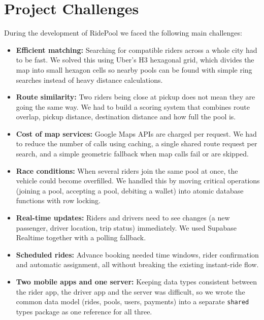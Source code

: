 \section{Project Challenges}
\label{sec:challenges}

During the development of RidePool we faced the following main challenges:

\begin{itemize}
  \item \textbf{Efficient matching:} Searching for compatible riders across a
        whole city had to be fast. We solved this using Uber's H3 hexagonal
        grid, which divides the map into small hexagon cells so nearby pools
        can be found with simple ring searches instead of heavy distance
        calculations.
  \item \textbf{Route similarity:} Two riders being close at pickup does not
        mean they are going the same way. We had to build a scoring system that
        combines route overlap, pickup distance, destination distance and how
        full the pool is.
  \item \textbf{Cost of map services:} Google Maps APIs are charged per
        request. We had to reduce the number of calls using caching, a single
        shared route request per search, and a simple geometric fallback when
        map calls fail or are skipped.
  \item \textbf{Race conditions:} When several riders join the same pool at
        once, the vehicle could become overfilled. We handled this by moving
        critical operations (joining a pool, accepting a pool, debiting a
        wallet) into atomic database functions with row locking.
  \item \textbf{Real-time updates:} Riders and drivers need to see changes (a
        new passenger, driver location, trip status) immediately. We used
        Supabase Realtime together with a polling fallback.
  \item \textbf{Scheduled rides:} Advance booking needed time windows, rider
        confirmation and automatic assignment, all without breaking the
        existing instant-ride flow.
  \item \textbf{Two mobile apps and one server:} Keeping data types consistent
        between the rider app, the driver app and the server was difficult, so
        we wrote the common data model (rides, pools, users, payments) into a
        separate \texttt{shared} types package as one reference for all three.
\end{itemize}

